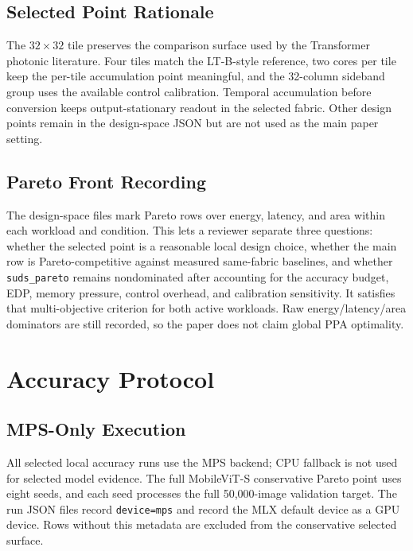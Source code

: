 \documentclass[10pt,journal]{IEEEtran}
\begin{document}
\subsection{Selected Point Rationale}

The \(32 \times 32\) tile preserves the comparison surface used by the
Transformer photonic literature. Four tiles match the LT-B-style reference, two
cores per tile keep the per-tile accumulation point meaningful, and the
32-column sideband group uses the available control calibration. Temporal
accumulation before conversion keeps output-stationary readout in the selected
fabric. Other design points remain in the design-space JSON but are not used as
the main paper setting.

\subsection{Pareto Front Recording}

The design-space files mark Pareto rows over energy, latency, and area within
each workload and condition. This lets a reviewer separate three questions:
whether the selected point is a reasonable local design choice, whether the main
row is Pareto-competitive against measured same-fabric baselines, and whether
\texttt{suds\_pareto} remains nondominated after accounting for the accuracy
budget, EDP, memory pressure, control overhead, and calibration sensitivity. It
satisfies that multi-objective criterion for both active workloads. Raw
energy/latency/area dominators are still recorded, so the paper does not claim
global PPA optimality.

\section{Accuracy Protocol}

\subsection{MPS-Only Execution}

All selected local accuracy runs use the MPS backend; CPU fallback is not used
for selected model evidence. The full MobileViT-S conservative Pareto point
uses eight seeds, and each seed processes the full 50,000-image validation
target. The run JSON files record \texttt{device=mps} and record the MLX
default device as a GPU device. Rows without this metadata are excluded from
the conservative selected surface.
\end{document}
